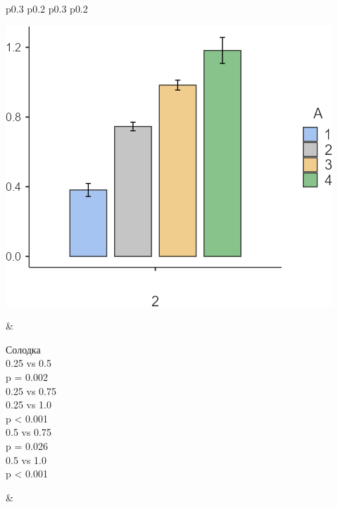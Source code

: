 \noindent
\begin{tabular}{p{0.3\textwidth} p{0.2\textwidth} p{0.3\textwidth} p{0.2\textwidth}}
\begin{minipage}[t]{\linewidth}
    \vspace{0pt} %
    \includegraphics[width=\linewidth]{media/chem/image9}
\end{minipage} & 
\begin{minipage}[t]{\linewidth}
    \vspace{0pt} %
    \small{
    Солодка \\
    0.25 vs 0.5 \\
    p = 0.002 \\
    0.25 vs 0.75 \\
    0.25 vs 1.0 \\
    p < 0.001 \\
    0.5 vs 0.75 \\
    p = 0.026 \\
    0.5 vs 1.0 \\
    p < 0.001}
\end{minipage} & 
\begin{minipage}[t]{\linewidth}
    \vspace{0pt} %

\end{minipage}
\end{tabular}
